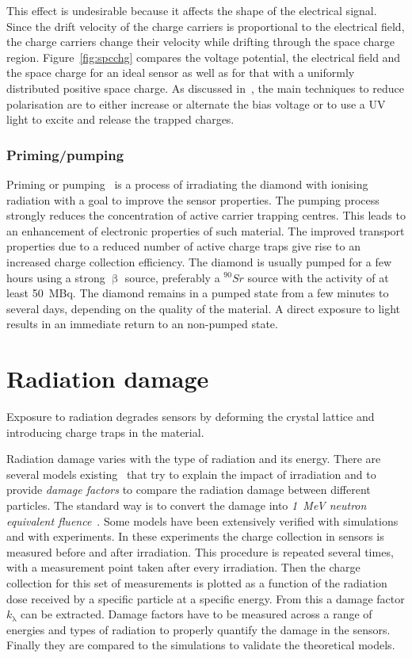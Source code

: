 This effect is undesirable because it affects the shape of the electrical signal. Since the drift velocity of the charge carriers is proportional to the electrical field, the charge carriers change their velocity while drifting through the space charge region. Figure~\ref{fig:spcchg} compares the voltage potential, the electrical field and the space charge for an ideal sensor as well as for that with a uniformly distributed positive space charge. As discussed in~\cite{Guthoff:1977429}, the main techniques to reduce polarisation are to either increase or alternate the bias voltage or to use a UV light to excite and release the trapped charges.


\subsubsection{Priming/pumping}
Priming or pumping~\cite{pumping:00000} is a process of irradiating the diamond with ionising radiation with a goal to improve the sensor properties. The pumping process strongly reduces the concentration of active carrier trapping centres. This leads to an enhancement of electronic properties of such material. The improved transport properties due to a reduced number of active charge traps give rise to an increased charge collection efficiency. The diamond is usually pumped for a few hours using a strong $\upbeta$ source, preferably a $^{90}Sr$ source with the activity of at least 50~MBq. The diamond remains in a pumped state from a few minutes to several days, depending on the quality of the material. A direct exposure to light results in an immediate return to an non-pumped state.



\section{Radiation damage}
\label{sec:raddam}
Exposure to radiation degrades sensors by deforming the crystal lattice and introducing charge traps in the material. 

Radiation damage varies with the type of radiation and its energy. There are several models existing~\cite{2002NIMPA,Guthoff:2014223} that try to explain the impact of irradiation and to provide \emph{damage factors} to compare the radiation damage between different particles. The standard way is to convert the damage into \emph{1~MeV neutron equivalent fluence}~\cite{NEQ:00000}. Some models have been extensively verified with simulations and with experiments. In these experiments the charge collection in sensors is measured before and after irradiation. This procedure is repeated several times, with a measurement point taken after every irradiation. Then the charge collection for this set of measurements is plotted as a function of the radiation dose received by a specific particle at a specific energy. From this a damage factor $k_\mathrm{\lambda}$ can be extracted. Damage factors have to be measured across a range of energies and types of radiation to properly quantify the damage in the sensors. Finally they are compared to the simulations to validate the theoretical models.

